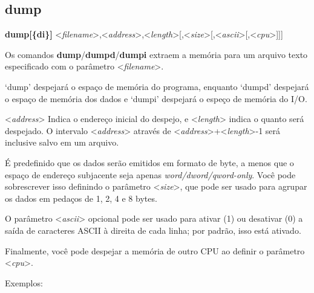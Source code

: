 \documentclass[letterpaper,10pt,brazil]{sphinxmanual}
\begin{document}
\subsection{dump}
\label{debugger/memory:debugger-command-dump}\label{debugger/memory:dump}
\begin{DUlineblock}{0em}
\item[]
\begin{DUlineblock}{\DUlineblockindent}
\item[] \textbf{dump{[}\{d\textbar{}i\}{]}} \textless{}\emph{filename}\textgreater{},\textless{}\emph{address}\textgreater{},\textless{}\emph{length}\textgreater{}{[},\textless{}\emph{size}\textgreater{}{[},\textless{}\emph{ascii}\textgreater{}{[},\textless{}\emph{cpu}\textgreater{}{]}{]}{]}
\item[] 
\end{DUlineblock}
\item[] Os comandos \textbf{dump}/\textbf{dumpd}/\textbf{dumpi} extraem a memória para um arquivo texto especificado com o parâmetro \textless{}\emph{filename}\textgreater{}.
\item[] `dump' despejará o espaço de memória do programa, enquanto `dumpd' despejará o espaço de memória dos dados e `dumpi' despejará o espeço de memória do I/O.
\item[] \textless{}\emph{address}\textgreater{} Indica o endereço inicial do despejo, e \textless{}\emph{length}\textgreater{} indica o quanto será despejado. O intervalo \textless{}\emph{address}\textgreater{} através de \textless{}\emph{address}\textgreater{}+\textless{}\emph{length}\textgreater{}-1 será inclusive salvo em um arquivo.
\item[] É predefinido que os dados serão emitidos em formato de byte, a menos que o espaço de endereço subjacente seja apenas \emph{word/dword/qword-only}. Você pode sobrescrever isso definindo o parâmetro \textless{}\emph{size}\textgreater{}, que pode ser usado para agrupar os dados em pedaços de 1, 2, 4 e 8 bytes.
\item[] O parâmetro \textless{}\emph{ascii}\textgreater{} opcional pode ser usado para ativar (1) ou desativar (0) a saída de caracteres ASCII à direita de cada linha; por padrão, isso está ativado.
\item[] Finalmente, você pode despejar a memória de outro CPU ao definir o parâmetro \textless{}\emph{cpu}\textgreater{}.
\item[] 
\item[] 
\item[] Exemplos:
\item[] 

\end{DUlineblock}
\end{document}
